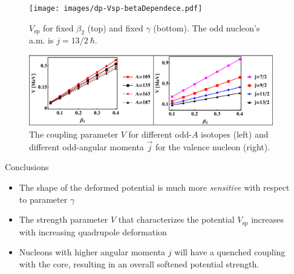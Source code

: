 \documentclass[final]{beamer}
\newlength{\sepwidth}
\newlength{\colwidth}
\newcommand{\separatorcolumn}{\begin{column}{\sepwidth}\end{column}}
\begin{document}
\begin{frame}[t]
\begin{columns}[t]
\begin{column}{\colwidth}
\begin{figure}
     \texttt{[image: images/dp-Vsp-betaDependece.pdf]}
     \caption{$V_\text{sp}$ for fixed $\beta_2$ (top) and fixed $\gamma$ (bottom). The odd nucleon's a.m. is $j=13/2\ \hbar$.}
     \label{gamma-beta-dev-v}
 \end{figure}
 \begin{figure}
     \centering
     \includegraphics[scale=1.4]{images/V_param.pdf}
     \caption{The coupling parameter $V$ for different odd-$A$ isotopes (left) and different odd-angular momenta $\vec{j}$ for the valence nucleon (right).}
     \label{v-param}
 \end{figure}
    \begin{block}{Conclusions}
    \begin{itemize}
    \item The shape of the deformed potential is much more \emph{sensitive} with respect to  parameter $\gamma$
    \item The strength parameter $V$ that characterizes the potential $V_\text{sp}$ increases with increasing quadrupole deformation
    \item Nucleons with higher angular momenta $j$ will have a quenched coupling with the core, resulting in an overall softened potential strength.
    \end{itemize}
  \end{block}


\end{column}

\separatorcolumn

\end{columns}

\end{frame}
\end{document}
